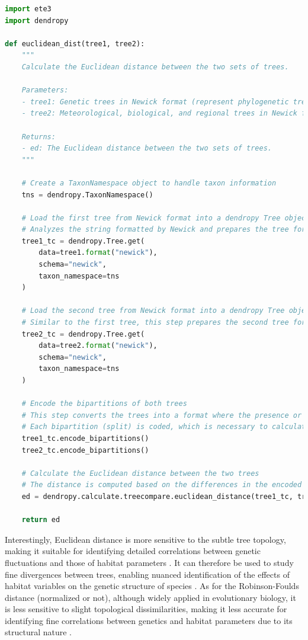 {%
\begin{lstlisting}[label=lst:euclideanDist,language=Python,caption=Python script for calculating the Euclidean distance using the ete3 and the dendropy packages in the aPhyloGeo package]
import ete3
import dendropy

def euclidean_dist(tree1, tree2):
    """
    Calculate the Euclidean distance between the two sets of trees.

    Parameters:
    - tree1: Genetic trees in Newick format (represent phylogenetic trees in text form).
    - tree2: Meteorological, biological, and regional trees in Newick format (represent variables trees in text form).

    Returns:
    - ed: The Euclidean distance between the two sets of trees.
    """

    # Create a TaxonNamespace object to handle taxon information
    tns = dendropy.TaxonNamespace()

    # Load the first tree from Newick format into a dendropy Tree object
    # Analyzes the string formatted by Newick and prepares the tree for comparison.
    tree1_tc = dendropy.Tree.get(
        data=tree1.format("newick"),
        schema="newick",
        taxon_namespace=tns
    )

    # Load the second tree from Newick format into a dendropy Tree object
    # Similar to the first tree, this step prepares the second tree for comparison.
    tree2_tc = dendropy.Tree.get(
        data=tree2.format("newick"),
        schema="newick",
        taxon_namespace=tns
    )

    # Encode the bipartitions of both trees
    # This step converts the trees into a format where the presence or absence of
    # Each bipartition (split) is coded, which is necessary to calculate distances.
    tree1_tc.encode_bipartitions()
    tree2_tc.encode_bipartitions()

    # Calculate the Euclidean distance between the two trees
    # The distance is computed based on the differences in the encoded bipartitions.
    ed = dendropy.calculate.treecompare.euclidean_distance(tree1_tc, tree2_tc)

    return ed
\end{lstlisting}

Interestingly, Euclidean distance is more sensitive to the subtle tree topology, making it suitable for identifying detailed correlations between genetic fluctuations and those of habitat parameters \citep{czarna2006topology}. It can therefore be used to study fine divergences between trees, enabling nuanced identification of the effects of habitat variables on the genetic structure of species \citep{czarna2006topology}. As for the Robinson-Foulds distance (normalized or not), although widely applied in evolutionary biology, it is less sensitive to slight topological dissimilarities, making it less accurate for identifying fine correlations between genetics and habitat parameters due to its structural nature \citep{smith2019bayesian, smith2020information}.

}
